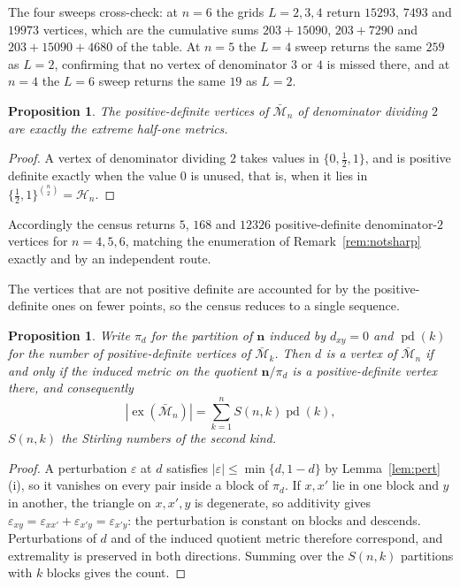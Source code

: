\documentclass[11pt]{article}
\newtheorem{proposition}[theorem]{Proposition}
\theoremstyle{definition}
\theoremstyle{remark}
\newcommand{\bM}{\bar{\mathcal{M}}}
\newcommand{\Ha}{\mathcal{H}}
\newcommand{\ex}{\operatorname{ex}}
\newcommand{\eps}{\varepsilon}
\begin{document}
The four sweeps cross-check: at $n=6$ the grids $L=2,3,4$ return $15293$, $7493$ and
$19973$ vertices, which are the cumulative sums $203+15090$, $203+7290$ and
$203+15090+4680$ of the table. At $n=5$ the $L=4$ sweep returns the same $259$ as $L=2$,
confirming that no vertex of denominator $3$ or $4$ is missed there, and at $n=4$ the $L=6$
sweep returns the same $19$ as $L=2$.

\begin{proposition}\label{prop:pd}
The positive-definite vertices of $\bM_n$ of denominator dividing $2$ are exactly the
extreme half-one metrics.
\end{proposition}

\begin{proof}
A vertex of denominator dividing $2$ takes values in $\{0,\tfrac12,1\}$, and is positive
definite exactly when the value $0$ is unused, that is, when it lies in
$\{\tfrac12,1\}^{\binom n2}=\Ha_n$.
\end{proof}

Accordingly the census returns $5$, $168$ and $12326$ positive-definite denominator-$2$
vertices for $n=4,5,6$, matching the enumeration of Remark~\ref{rem:notsharp} exactly and
by an independent route.

The vertices that are not positive definite are accounted for by the positive-definite ones
on fewer points, so the census reduces to a single sequence.

\begin{proposition}\label{prop:descent}
Write $\pi_d$ for the partition of $\mathbf n$ induced by $d_{xy}=0$ and $\operatorname{pd}(k)$
for the number of positive-definite vertices of $\bM_k$. Then $d$ is a vertex of $\bM_n$ if
and only if the induced metric on the quotient $\mathbf n/\pi_d$ is a positive-definite
vertex there, and consequently
\[
|\ex(\bM_n)|=\sum_{k=1}^{n}S(n,k)\operatorname{pd}(k),
\]
$S(n,k)$ the Stirling numbers of the second kind.
\end{proposition}

\begin{proof}
A perturbation $\eps$ at $d$ satisfies $|\eps|\leq\min\{d,1-d\}$ by
Lemma~\ref{lem:pert}(i), so it vanishes on every
pair inside a block of $\pi_d$. If $x,x'$ lie in one block and $y$ in another, the triangle
on $x,x',y$ is degenerate, so additivity gives $\eps_{xy}=\eps_{xx'}+\eps_{x'y}=\eps_{x'y}$:
the perturbation is constant on blocks and descends. Perturbations of $d$ and of the induced
quotient metric therefore correspond, and extremality is preserved in both directions.
Summing over the $S(n,k)$ partitions with $k$ blocks gives the count.
\end{proof}
\end{document}
